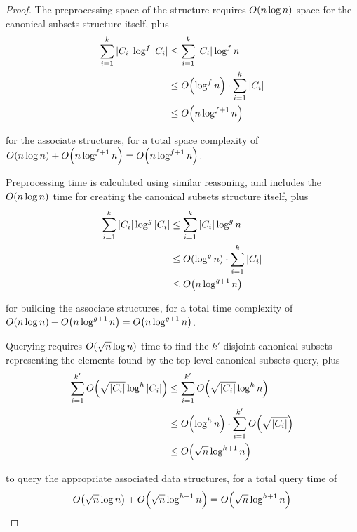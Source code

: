\begin{proof}
The preprocessing space of the structure requires $O\!\left(n \log{n}\right)$ space for the canonical subsets structure itself, plus
\[
\begin{split}
\sum_{i=1}^k{|C_i| \log^f{|C_i|}}
&\leq \sum_{i=1}^k{|C_i| \log^f{n}} \\
%
&\leq \BigOh{\log^f{n}} \cdot \sum_{i=1}^k{|C_i|} \\
%
&\leq \BigOh{n\log^{f+1}{n}}
\end{split}
\]

\noindent for the associate structures, for a total space complexity of $O\!\left(n \log{n}\right) + O\!\left(n\log^{f+1}{n}\right) = O\!\left(n\log^{f+1}{n}\right)$.

Preprocessing time is calculated using similar reasoning, and includes the $O\!\left(n \log{n}\right)$ time for creating the canonical subsets structure itself, plus
\[
\begin{split}
\sum_{i=1}^k{|C_i| \log^g{|C_i|}}
&\leq \sum_{i=1}^k{|C_i| \log^g{n}} \\
%
&\leq \BigOh{\log^g{n}} \cdot \sum_{i=1}^k{|C_i|} \\
%
&\leq \BigOh{n\log^{g+1}{n}}
\end{split}
\]

\noindent for building the associate structures, for a total time complexity of $O\!\left(n \log{n}\right) + O\!\left(n\log^{g+1}{n}\right) = O\!\left(n\log^{g+1}{n}\right)$.

Querying requires $O\!\left(\sqrt{n}\log{n}\right)$ time to find the $k'$ disjoint canonical subsets representing the elements found by the top-level canonical subsets query, plus
\[
\begin{split}
\sum_{i=1}^{k'}{\BigOh{\sqrt{|C_i|}\log^h{|C_i|}}} 
&\leq \sum_{i=1}^{k'}{\BigOh{\sqrt{|C_i|}\log^h{n}}} \\
%
&\leq \BigOh{\log^h{n}} \cdot \sum_{i=1}^{k'}{\BigOh{\sqrt{|C_i|}}} \\
%
&\leq \BigOh{\sqrt{n}\log^{h+1}{n}} \\
\end{split}
\]

\noindent to query the appropriate associated data structures, for a total query time of 
\[
O\!\left(\sqrt{n}\log{n}\right) + O\!\left(\sqrt{n}\log^{h+1}{n}\right) = O\!\left(\sqrt{n}\log^{h+1}{n}\right)
\]

\end{proof}